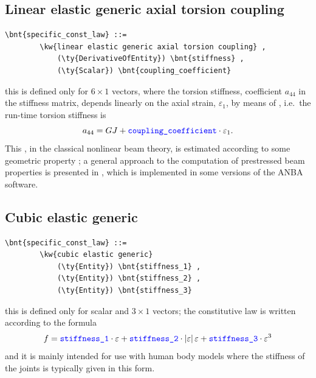 \subsection{Linear elastic generic axial torsion coupling}
\label{sec:CONSTITUTIVE-LAWS:LINEAR-ELASTIC-GENERIC-AXIAL-TORSION-COUPLING}
\begin{Verbatim}[commandchars=\\\{\}]
    \bnt{specific_const_law} ::= 
        \kw{linear elastic generic axial torsion coupling} ,
            (\ty{DerivativeOfEntity}) \bnt{stiffness} ,
            (\ty{Scalar}) \bnt{coupling_coefficient}
\end{Verbatim}
this is defined only for $6 \times 1$ vectors, where the torsion stiffness,
coefficient $ a_{44} $ in the stiffness matrix, depends linearly on 
the axial strain, $ \varepsilon_1 $, by means of 
, i.e.\ the run-time torsion stiffness is 
\begin{displaymath}
	a_{44} = GJ + \textcolor{blue}{\texttt{coupling\_coefficient}} \cdot \varepsilon_1 .
\end{displaymath}
This , in the classical nonlinear beam theory,
is estimated according to some geometric property \cite{HOUBOLT-BROOKS-1957};
a general approach to the computation of prestressed beam properties
is presented in \cite{BORRI-MERLINI}, which is implemented in some versions
of the ANBA software.

\subsection{Cubic elastic generic}
\begin{Verbatim}[commandchars=\\\{\}]
    \bnt{specific_const_law} ::= 
        \kw{cubic elastic generic}
            (\ty{Entity}) \bnt{stiffness_1} ,
            (\ty{Entity}) \bnt{stiffness_2} ,
            (\ty{Entity}) \bnt{stiffness_3}
\end{Verbatim}
this is defined only for scalar and $3 \times 1$ vectors; the constitutive
law is written according to the formula
\begin{displaymath}
	f = \textcolor{blue}{\texttt{stiffness\_1}} \cdot \varepsilon
	+ \textcolor{blue}{\texttt{stiffness\_2}} \cdot \left| \varepsilon \right|\varepsilon
	+ \textcolor{blue}{\texttt{stiffness\_3}} \cdot \varepsilon^3
\end{displaymath}
and it is mainly intended for use with human body models 
where the stiffness of the joints is typically given in this form.

